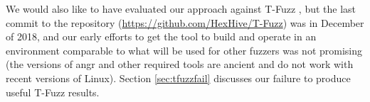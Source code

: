 We would also like to have evaluated our approach against T-Fuzz \cite{tfuzz}, but the last commit to the repository (\url{https://github.com/HexHive/T-Fuzz}) was in December of 2018, and our early efforts to get the tool to build and operate in an environment comparable to what will be used for other fuzzers was not promising (the versions of angr and other required tools are ancient and do not work with recent versions of Linux).  Section \ref{sec:tfuzzfail} discusses our failure to produce useful T-Fuzz results.
